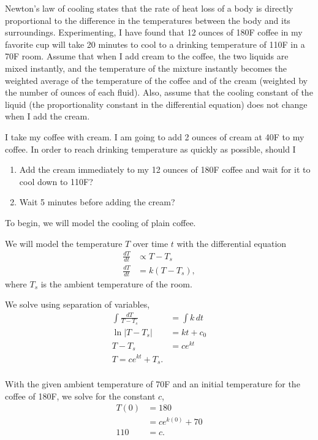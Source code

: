 \documentclass[../hw11]{subfiles}
\begin{document}
Newton’s law of cooling states that the rate of heat loss of a body is directly proportional to the difference in the temperatures between the body and its surroundings. 
Experimenting, I have found that 12 ounces of 180F coffee in my favorite cup will take 20 minutes to cool to a drinking temperature
of 110F in a 70F room. 
Assume that when I add cream to the coffee, the two liquids are mixed instantly, and the temperature of the mixture instantly becomes the weighted average of the temperature of the coffee and of the cream (weighted by the number of ounces of each fluid).
Also, assume that the cooling constant of the liquid (the proportionality constant in the differential equation) does not change when I add the cream.

I take my coffee with cream. I am going to add 2 ounces of cream at 40F to my coffee. In order to reach drinking temperature as quickly as possible, should I

\begin{enumerate}[label= (\alph*)]
    \item Add the cream immediately to my 12 ounces of 180F coffee and wait for it to cool down to 110F\@?
    \item Wait 5 minutes before adding the cream?
\end{enumerate}

To begin, we will model the cooling of plain coffee.

We will model the temperature $T$ over time $t$ with the differential equation
\begin{align*}
    \frac{dT}{dt}&\propto T-T_s \\
    \frac{dT}{dt}&=k(T-T_s),
\end{align*}
where $T_s$ is the ambient temperature of the room.

We solve using separation of variables,
\begin{align*}
    \int \frac{dT}{T-T_s}&=\int k\,dt\\
    \ln{|T-T_s|}&=kt+c_0 \\
    T-T_s&=ce^{kt} \\
    T=ce^{kt}+T_s. \\
\end{align*}

With the given ambient temperature of 70F and an initial temperature for the coffee of 180F, we solve for the constant $c$,
\begin{align*}
    T(0)&=180\\
    &=ce^{k(0)}+70 \\
    110&=c. \\
\end{align*}
\end{document}
